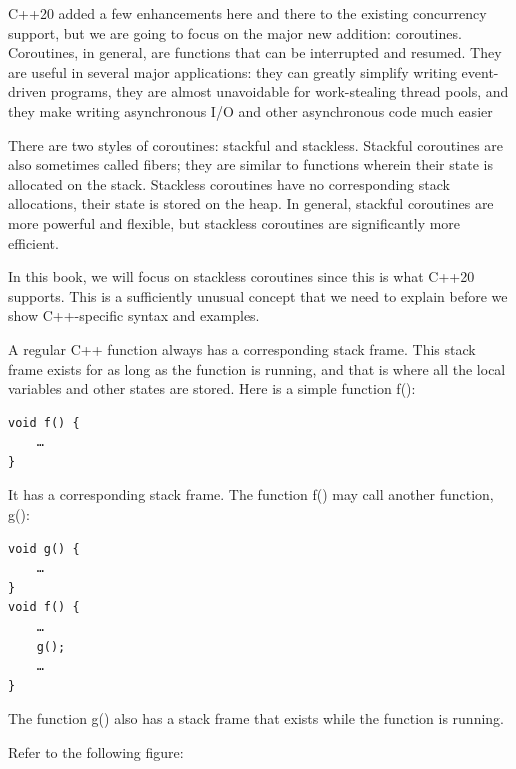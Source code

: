 
C++20 added a few enhancements here and there to the existing concurrency support, but we are going to focus on the major new addition: coroutines. Coroutines, in general, are functions that can be interrupted and resumed. They are useful in several major applications: they can greatly simplify writing event-driven programs, they are almost unavoidable for work-stealing thread pools, and they make writing asynchronous I/O and other asynchronous code much easier


There are two styles of coroutines: stackful and stackless. Stackful coroutines are also sometimes called fibers; they are similar to functions wherein their state is allocated on the stack. Stackless coroutines have no corresponding stack allocations, their state is stored on the heap. In general, stackful coroutines are more powerful and flexible, but stackless coroutines are significantly more efficient.

In this book, we will focus on stackless coroutines since this is what C++20 supports. This is a sufficiently unusual concept that we need to explain before we show C++-specific syntax and examples.

A regular C++ function always has a corresponding stack frame. This stack frame exists for as long as the function is running, and that is where all the local variables and other states are stored. Here is a simple function f(): 

\begin{lstlisting}[style=styleCXX]
void f() {
	…
}
\end{lstlisting}

It has a corresponding stack frame. The function f() may call another function, g():

\begin{lstlisting}[style=styleCXX]
void g() {
	…
}
void f() {
	…
	g();
	…
}
\end{lstlisting}

The function g() also has a stack frame that exists while the function is running. 

Refer to the following figure:

